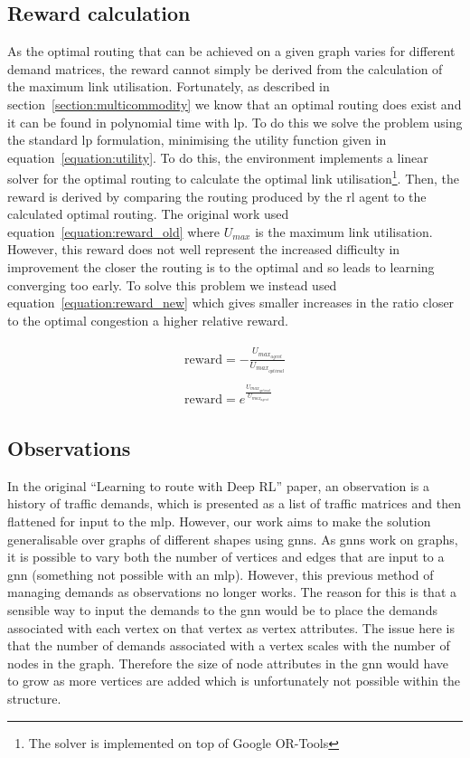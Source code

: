 \subsection{Reward calculation}
As the optimal routing that can be achieved on a given graph varies for different demand matrices, the reward cannot simply be derived from the calculation of the maximum link utilisation. Fortunately, as described in section~\ref{section:multicommodity} we know that an optimal routing does exist and it can be found in polynomial time with \ac{lp}. To do this we solve the problem using the standard \ac{lp} formulation, minimising the utility function given in equation~\ref{equation:utility}. To do this, the environment implements a linear solver for the optimal routing to calculate the optimal link utilisation\footnote{The solver is implemented on top of Google OR-Tools\cite{ortools}}. Then, the reward is derived by comparing the routing produced by the \ac{rl} agent to the calculated optimal routing. The original work used equation~\ref{equation:reward_old} where $U_{max}$ is the maximum link utilisation. However, this reward does not well represent the increased difficulty in improvement the closer the routing is to the optimal and so leads to learning converging too early. To solve this problem we instead used equation~\ref{equation:reward_new} which gives smaller increases in the ratio closer to the optimal congestion a higher relative reward.

\begin{align}
  \begin{split}
    \label{equation:reward_old}
    \mathrm{reward} = -\frac{U_{max_{agent}}}{U_{max_{optimal}}}
  \end{split}\\
  \begin{split}
    \label{equation:reward_new}
    \mathrm{reward} = e^{\frac{U_{max_{optimal}}}{U_{max_{agent}}}}
  \end{split}
\end{align}


\subsection{Observations}
In the original ``Learning to route with Deep RL'' paper, an observation is a history of traffic demands, which is presented as a list of traffic matrices and then flattened for input to the \ac{mlp}. However, our work aims to make the solution generalisable over graphs of different shapes using \acp{gnn}. As \acp{gnn} work on graphs, it is possible to vary both the number of vertices and edges that are input to a \ac{gnn} (something not possible with an \ac{mlp}). However, this previous method of managing demands as observations no longer works. The reason for this is that a sensible way to input the demands to the \ac{gnn} would be to place the demands associated with each vertex on that vertex as vertex attributes. The issue here is that the number of demands associated with a vertex scales with the number of nodes in the graph. Therefore the size of node attributes in the \ac{gnn} would have to grow as more vertices are added which is unfortunately not possible within the structure.

